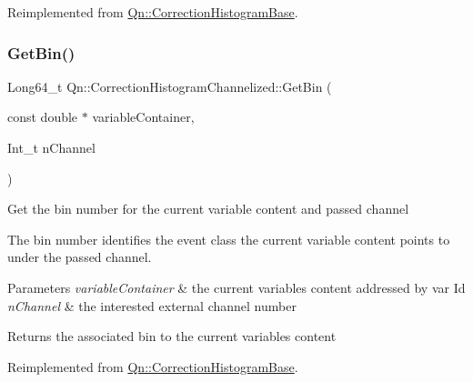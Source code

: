 Reimplemented from \mbox{\hyperlink{classQn_1_1CorrectionHistogramBase_ae94b20c7d396f5b179fb11d84d764c09}{Qn\+::\+Correction\+Histogram\+Base}}.

\mbox{\label{classQn_1_1CorrectionHistogramChannelized_a2491d6649af34766c3e848db8ed6e796}} 
\subsubsection{\texorpdfstring{Get\+Bin()}{GetBin()}}
{\footnotesize\ttfamily Long64\+\_\+t Qn\+::\+Correction\+Histogram\+Channelized\+::\+Get\+Bin (\begin{DoxyParamCaption}\item[{const double $\ast$}]{variable\+Container,  }\item[{Int\+\_\+t}]{n\+Channel }\end{DoxyParamCaption})\hspace{0.3cm}{\ttfamily [virtual]}}

Get the bin number for the current variable content and passed channel

The bin number identifies the event class the current variable content points to under the passed channel.


\begin{DoxyParams}{Parameters}
{\em variable\+Container} & the current variables content addressed by var Id \\
\hline
{\em n\+Channel} & the interested external channel number \\
\hline
\end{DoxyParams}
\begin{DoxyReturn}{Returns}
the associated bin to the current variables content 
\end{DoxyReturn}


Reimplemented from \mbox{\hyperlink{classQn_1_1CorrectionHistogramBase_acfde166908e4da950470841f21f87fb9}{Qn\+::\+Correction\+Histogram\+Base}}.

\mbox{\label{classQn_1_1CorrectionHistogramChannelized_ab398b7a1d5d9a92e183ea164882b4a53}} 
